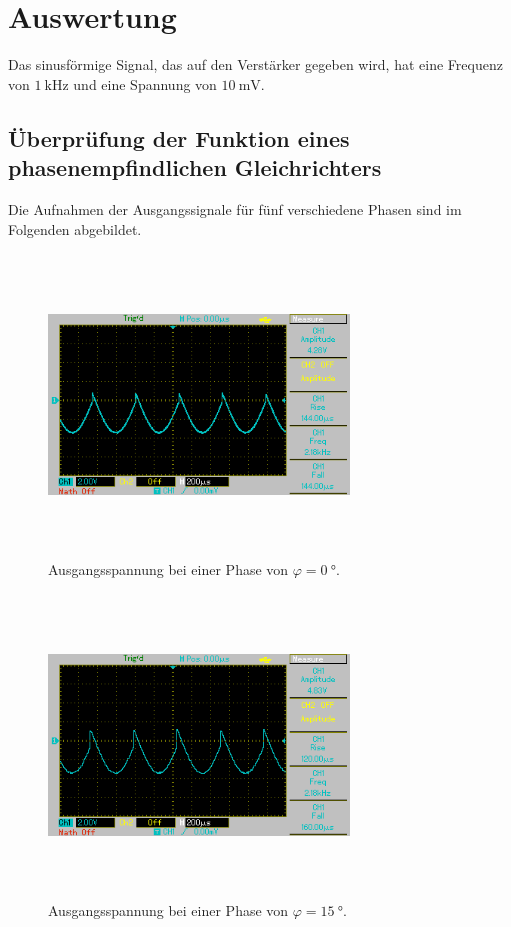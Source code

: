 \section{Auswertung}
\label{sec:Auswertung}

Das sinusförmige Signal, das auf den Verstärker gegeben wird, hat eine Frequenz
von $\SI{1}{\kilo\hertz}$ und eine Spannung von $\SI{10}{\milli\volt}$. %

\subsection{Überprüfung der Funktion eines phasenempfindlichen Gleichrichters}
\label{sec:teil1}
Die Aufnahmen der Ausgangssignale für fünf verschiedene Phasen sind im Folgenden abgebildet.
\begin{figure}
    \centering
    \includegraphics[width=8cm, height=8cm]{build/1.BMP} %
    \caption{Ausgangsspannung bei einer Phase von $\varphi = \SI{0}{\degree}$.}
    \label{fig:bild1}
\end{figure}

\begin{figure}
    \centering
    \includegraphics[width=8cm, height=8cm]{build/2.BMP}
    \caption{Ausgangsspannung bei einer Phase von $\varphi = \SI{15}{\degree}$.}
    \label{fig:bild2}
\end{figure}

